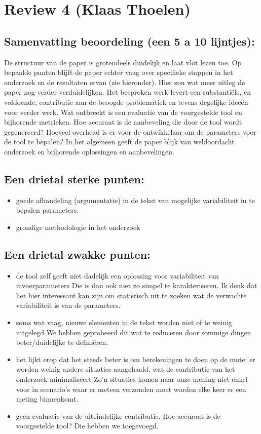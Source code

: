 \documentclass[11pt]{article}
\begin{document}
\section{Review 4 (Klaas Thoelen)}

\subsection{Samenvatting beoordeling (een 5 a 10 lijntjes):}
De structuur van de paper is grotendeels duidelijk en laat vlot lezen toe. Op
bepaalde punten blijft de paper echter vaag over specifieke stappen in het
onderzoek en de resultaten ervan (zie hieronder). Hier zou wat meer uitleg de
paper nog verder verduidelijken. Het besproken werk levert een substantiële, en
voldoende, contributie aan de beoogde problematiek en tevens degelijke ideeën
voor verder werk. Wat ontbreekt is een evaluatie van de voorgestelde tool en
bijhorende metrieken. Hoe accuraat is de aanbeveling die door de tool wordt
gegenereerd? Hoeveel overhead is er voor de ontwikkelaar om de parameters voor
de tool te bepalen? In het algemeen geeft de paper blijk van weldoordacht
onderzoek en bijhorende oplossingen en aanbevelingen.



\subsection{Een drietal sterke punten:}
\begin{itemize}
\item goede afhandeling (argumentatie) in de tekst van mogelijke variabiliteit in te bepalen parameters.
\item grondige methodologie in het onderzoek
\end{itemize}

\subsection{Een drietal zwakke punten:}
\begin{itemize}
\item de tool zelf geeft niet dadelijk een oplossing voor variabiliteit van invoerparameters {\color{red} Die is dan ook niet zo simpel te karakteriseren. Ik denk dat het hier interessant kan zijn om statistisch uit te zoeken wat de verwachte variabiliteit is van de parameters.}
\item soms wat vaag, nieuwe elementen in de tekst worden niet of te weinig uitgelegd {\color{red} We hebben geprobeerd dit wat te reduceren door sommige dingen beter/duidelijke te definiëren.}
\item het lijkt erop dat het steeds beter is om berekeningen te doen op de mote;
er worden weinig andere situaties aangehaald, wat de contributie van het
onderzoek minimaliseert {\color{red} Zo'n situaties komen naar onze mening niet
enkel voor in scenario's waar er meteen verzonden moet worden elke keer er een
meting binnenkomt.}
\item geen evaluatie van de uiteindelijke contributie. Hoe accuraat is de voorgestelde tool? {\color{red} Die hebben we toegevoegd.}
\end{itemize}
\end{document}
